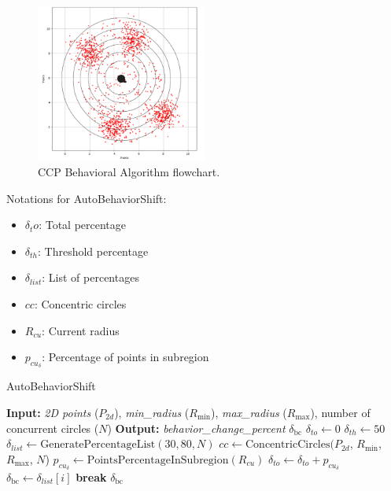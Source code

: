 \begin{figure}[H]
    \centering
    \includegraphics[width=0.5\textwidth]{Images/Algorithm_no_obs/auto.png}
    \caption{CCP Behavioral Algorithm flowchart.}
    \label{fig:auto_shift}
\end{figure}


Notations for AutoBehaviorShift:
\begin{multicols}{2}
    \begin{itemize}[noitemsep,topsep=0pt]
        \item $\delta_to$: Total percentage
        \item $\delta_{th}$: Threshold percentage
        \item $\delta_{list}$: List of percentages
        \item $cc$: Concentric circles
        \item $R_{cu}$: Current radius
        \item $p_{cu_\delta}$: Percentage of points in subregion
    \end{itemize}
\end{multicols}

\begin{algorithm}[H]
    \caption{AutoBehaviorShift}
    \label{alg:autobehaviorshift}
    \begin{algorithmic}[1]
    \Statex \textbf{Input: }  \textit{2D points} ($P_{2d}$), \textit{min\_radius} ($R_{\text{min}}$),  \textit{max\_radius} ($R_{\text{max}}$), number of concurrent circles ($N$) 
    \Statex \textbf{Output: } \textit{behavior\_change\_percent} $\delta_{\text{bc}}$ 
    \newline
    \State $\delta_{to} \leftarrow 0$ 
    \State $\delta_{th} \leftarrow 50$ 
    \State $\delta_{list} \leftarrow \text{GeneratePercentageList}(30, 80, N)$ 
    \State $cc \leftarrow \text{ConcentricCircles}(P_{2d}$, $R_{\text{min}}$, $R_{\text{max}}$, $N$)
        \State $p_{cu_\delta} \leftarrow \text{PointsPercentageInSubregion}(R_{cu})$
        \State $\delta_{to} \leftarrow \delta_{to} + p_{cu_\delta}$
            \State $\delta_{\text{bc}} \leftarrow \delta_{list}[i]$
            \State \textbf{break}
        \EndIf
    \EndFor
    \State \Return $\delta_{\text{bc}}$
    \end{algorithmic}
    \end{algorithm}


